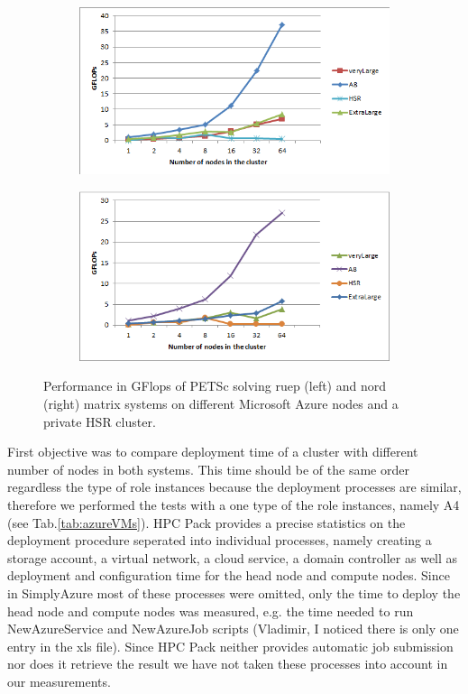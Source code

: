 \documentclass[3p,times]{elsarticle}
\begin{document}
\begin{figure}
\centering
\begin{subfigure}{.5\textwidth}
  \centering
	\includegraphics[width=\linewidth]{ruppel}  
  \label{fig:ruepel}
\end{subfigure}%
\begin{subfigure}{.5\textwidth}
  \centering
  \includegraphics[width=\linewidth]{nord.png}
  \label{fig:nord}
\end{subfigure}
\caption{Performance in GFlops of PETSc solving ruep (left) and nord (right) matrix systems on different Microsoft Azure nodes and a private HSR cluster. }
\label{fig:test}
\end{figure}


 
First objective was to compare deployment time of a cluster with different number of nodes in both systems. This time should be of the same order regardless the type of role instances because the deployment processes are similar, therefore we performed the tests with a one type of the role instances, namely A4 (see Tab.\ref{tab:azureVMs}). HPC Pack provides a precise statistics on the deployment procedure seperated into individual processes, namely creating a storage account, a virtual network, a cloud service, a domain controller as well as  deployment and configuration time for the head node and compute nodes. Since in SimplyAzure most of these processes were omitted, only the time to deploy the head node and compute nodes was measured, e.g. the time needed to run NewAzureService and NewAzureJob scripts (\textcolor[rgb]{1,0,0}{Vladimir, I noticed there is only one entry in the xls file}). Since HPC Pack neither provides automatic job submission nor does it retrieve the result we have not taken these processes into account in our measurements. 
\end{document}
